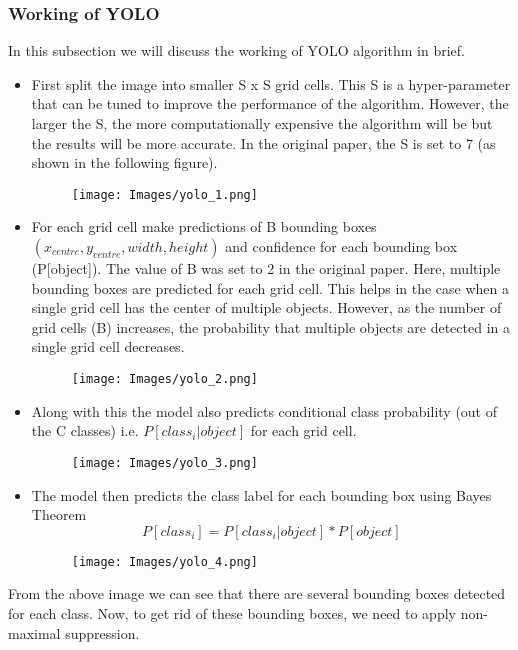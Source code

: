 \documentclass[conference]{IEEEtran}
\begin{document}
\subsubsection*{\textbf{Working of YOLO}}
In this subsection we will discuss the working of YOLO algorithm in brief.
\begin{itemize}
  \item First split the image into smaller S x S grid cells. This S is a hyper-parameter that can be tuned to improve the performance of the algorithm. However, the larger the S, the more computationally expensive the algorithm will be but the results will be more accurate. In the original paper, the S is set to 7 (as shown in the following figure).
        \begin{figure}[H]
          \centering
          \texttt{[image: Images/yolo\_1.png]}
        \end{figure}
  \item For each grid cell make predictions of B bounding boxes $(x_{centre },y_{centre} ,width, height)$ and confidence for each bounding box (P[object]). The value of B was set to 2 in the original paper. Here, multiple bounding boxes are predicted for each grid cell. This helps in the case when a single grid cell has the center of multiple objects. However, as the number of grid cells (B) increases, the probability that multiple objects are detected in a single grid cell decreases.
        \begin{figure}[H]
          \centering
          \texttt{[image: Images/yolo\_2.png]}
        \end{figure}
  \item Along with this the model also predicts conditional class probability (out of the C classes) i.e. $P[class_i|object]$ for each grid cell.
        \begin{figure}[H]
          \centering
          \texttt{[image: Images/yolo\_3.png]}
        \end{figure}
  \item The model then predicts the class label for each bounding box using Bayes Theorem
        \begin{equation*}
          P[class_i] = P[class_i|object] * P[object]
        \end{equation*}
        \begin{figure}[H]
          \centering
          \texttt{[image: Images/yolo\_4.png]}
        \end{figure}
\end{itemize}
From the above image we can see that there are several bounding boxes detected for each class. Now, to get rid of these bounding boxes, we need to apply non-maximal suppression.
\end{document}

